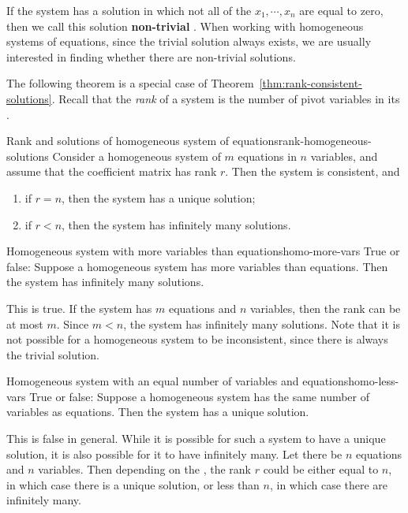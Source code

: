 If the system has a solution in which not all of the
$x_1, \cdots, x_n$ are equal to zero, then we call this solution
\textbf{non-trivial}%
%
.  When
working with homogeneous systems of equations, since the trivial
solution always exists, we are usually interested in finding whether
there are non-trivial solutions.

The following theorem is a special case of
Theorem~\ref{thm:rank-consistent-solutions}. Recall that the
{\em rank}
of a system is the number of pivot variables in its {\ef}.

\begin{theorem}{Rank and solutions of homogeneous system of equations}{rank-homogeneous-solutions}
  Consider a homogeneous system of $m$ equations in $n$ variables, and
  assume that the coefficient matrix has rank $r$. Then the system is
  consistent, and 
\begin{enumerate}
\item if $r=n$, then the system has a unique solution;
\item if $r<n$, then the system has infinitely many solutions.
\end{enumerate}
\end{theorem}

\begin{example}{Homogeneous system with more variables than equations}{homo-more-vars}
  True or false: Suppose a homogeneous system has more variables than
  equations. Then the system has infinitely many solutions.  
\end{example}

\begin{solution}
  This is true. If the system has $m$ equations and $n$ variables,
  then the rank can be at most $m$. Since $m<n$, the system has
  infinitely many solutions. Note that it is not possible for a
  homogeneous system to be inconsistent, since there is always the
  trivial solution.
\end{solution} 

\begin{example}{Homogeneous system with an equal number of variables and equations}{homo-less-vars}
  True or false: Suppose a homogeneous system has the same number of
  variables as equations. Then the system has a unique solution.
\end{example}

\begin{solution}
  This is false in general. While it is possible for such a system to
  have a unique solution, it is also possible for it to have
  infinitely many. Let there be $n$ equations and $n$ variables.  Then
  depending on the {\ef}, the rank $r$ could be either equal to $n$,
  in which case there is a unique solution, or less than $n$, in which
  case there are infinitely many.
\end{solution}

